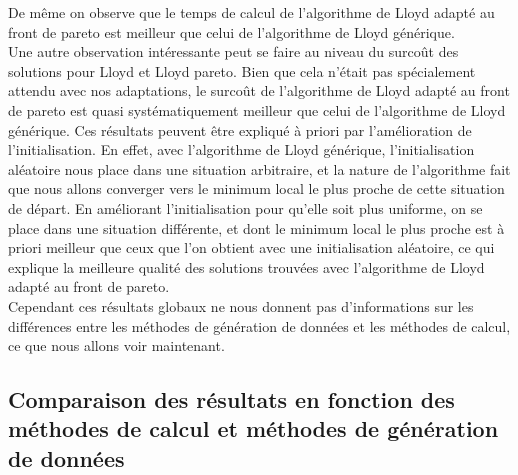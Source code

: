 ﻿\documentclass{meta}
\begin{document}
{\begin{center}
\end{center}

De même on observe que le temps de calcul de l'algorithme de Lloyd adapté au front de pareto est meilleur que celui de l'algorithme de Lloyd générique.\\
Une autre observation intéressante peut se faire au niveau du surcoût des solutions pour Lloyd et Lloyd pareto. Bien que cela n'était pas spécialement attendu avec nos adaptations, le surcoût de l'algorithme de Lloyd adapté au front de pareto est quasi systématiquement meilleur que celui de l'algorithme de Lloyd générique. Ces résultats peuvent être expliqué à priori par l'amélioration de l'initialisation. En effet, avec l'algorithme de Lloyd générique, l'initialisation aléatoire nous place dans une situation arbitraire, et la nature de l'algorithme fait que nous allons converger vers le minimum local le plus proche de cette situation de départ. En améliorant l'initialisation pour qu'elle soit plus uniforme, on se place dans une situation différente, et dont le minimum local le plus proche est à priori meilleur que ceux que l'on obtient avec une initialisation aléatoire, ce qui explique la meilleure qualité des solutions trouvées avec l'algorithme de Lloyd adapté au front de pareto.\\

Cependant ces résultats globaux ne nous donnent pas d'informations sur les différences entre les méthodes de génération de données et les méthodes de calcul, ce que nous allons voir maintenant.

\subsection{Comparaison des résultats en fonction des méthodes de calcul et méthodes de génération de données}

}
\end{document}
